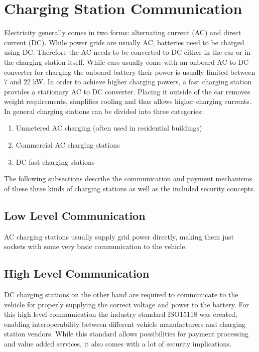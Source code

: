 \documentclass[conference,flushend]{iaria} %
\begin{document}
\section{Charging Station Communication}
Electricity generally comes in two forms: alternating current (AC) and direct current (DC).
While power grids are usually AC, batteries need to be charged using DC.
Therefore the AC needs to be converted to DC either in the car or in the charging station itself.
While cars usually come with an onboard AC to DC converter for charging the onboard battery their power is usually limited between 7 and 22 kW.
In order to achieve higher charging powers, a fast charging station provides a stationary AC to DC converter. Placing it outside of the car removes weight requirements, simplifies cooling and thus allows higher charging currents. \\
In general charging stations can be divided into three categories:
\begin{enumerate}
\item Unmetered AC charging (often used in residential buildings)
\item Commercial AC charging stations
\item DC fast charging stations
\end{enumerate}%
%
The following subsections describe the communication and payment mechanisms of these three kinds of charging stations as well as the included security concepts.

\subsection{Low Level Communication}
AC charging stations usually supply grid power directly, making them just sockets with some very basic communication to the vehicle.


\subsection{High Level Communication}
DC charging stations on the other hand are required to communicate to the vehicle for properly supplying the correct voltage and power to the battery.
For this high level communication the industry standard ISO15118 was created, enabling interoperability between different vehicle manufacturers and charging station vendors.
While this standard allows possibilities for payment processing and value added services, it also comes with a lot of security implications.
\end{document}
